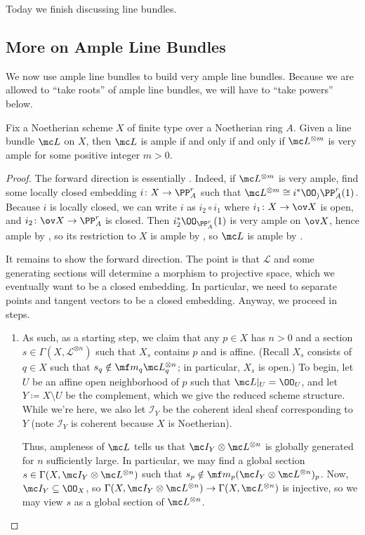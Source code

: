 \documentclass[../notes.tex]{subfiles}
\begin{document}
Today we finish discussing line bundles.

\subsection{More on Ample Line Bundles}
We now use ample line bundles to build very ample line bundles. Because we are allowed to ``take roots'' of ample line bundles, we will have to ``take powers'' below.
\begin{proposition}
	Fix a Noetherian scheme $X$ of finite type over a Noetherian ring $A$. Given a line bundle $\mc L$ on $X$, then $\mc L$ is ample if and only if and only if $\mc L^{\otimes m}$ is very ample for some positive integer $m>0$.
\end{proposition}
\begin{proof}
	The forward direction is essentially . Indeed, if $\mc L^{\otimes m}$ is very ample, find some locally closed embedding $i\colon X\to\PP^r_A$ such that $\mc L^{\otimes m}\cong i^*\OO_){\PP^r_A}(1)$. Because $i$ is locally closed, we can write $i$ as $i_2\circ i_1$ where $i_1\colon X\to\ov X$ is open, and $i_2\colon\ov X\to\PP^r_A$ is closed. Then $i_2^*\OO_{\PP^r_A}(1)$ is very ample on $\ov X$, hence ample by , so its restriction to $X$ is ample by , so $\mc L$ is ample by .

	It remains to show the forward direction. The point is that $\mathcal L$ and some generating sections will determine a morphism to projective space, which we eventually want to be a closed embedding. In particular, we need to separate points and tangent vectors to be a closed embedding. Anyway, we proceed in steps.
	\begin{enumerate}
		\item As such, as a starting step, we claim that any $p\in X$ has $n>0$ and a section $s\in\Gamma\left(X,\mathcal L^{\otimes n}\right)$ such that $X_s$ contains $p$ and is affine. (Recall $X_s$ consists of $q\in X$ such that $s_q\notin\mf m_q\mc L^{\otimes n}_q$; in particular, $X_s$ is open.) To begin, let $U$ be an affine open neighborhood of $p$ such that $\mc L|_U=\OO_U$, and let $Y\coloneqq X\setminus U$ be the complement, which we give the reduced scheme structure. While we're here, we also let $\mathcal I_Y$ be the coherent ideal sheaf corresponding to $Y$ (note $\mathcal I_Y$ is coherent because $X$ is Noetherian).

		Thus, ampleness of $\mc L$ tells us that $\mc I_Y\otimes\mc L^{\otimes n}$ is globally generated for $n$ sufficiently large. In particular, we may find a global section $s\in\Gamma(X,\mc I_Y\otimes\mc L^{\otimes n})$ such that $s_p\notin\mf m_p(\mc I_Y\otimes\mc L^{\otimes n})_p$. Now, $\mc I_Y\subseteq\OO_X$, so $\Gamma(X,\mc I_Y\otimes\mc L^{\otimes n})\to\Gamma(X,\mc L^{\otimes n})$ is injective, so we may view $s$ as a global section of $\mc L^{\otimes n}$.


\end{enumerate}
\end{proof}
\end{document}
